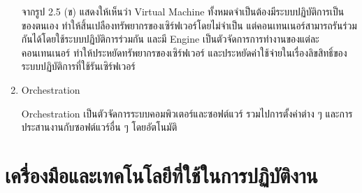 \begin{enumerate}
	จากรูป 2.5 (ข) แสดงให้เห็นว่า Virtual Machine ทั้งหมดจำเป็นต้องมีระบบปฏิบัติการเป็นของตนเอง ทำให้สิ้นเปลืองทรัพยากรของเซิร์ฟเวอร์โดยไม่จำเป็น แต่คอนเทนเนอร์สามารถรันร่วมกันได้โดยใช้ระบบปฏิบัติการร่วมกัน และมี Engine เป็นตัวจัดการการทำงานของแต่ละคอนเทนเนอร์ ทำให้ประหยัดทรัพยากรของเซิร์ฟเวอร์ และประหยัดค่าใช้จ่ายในเรื่องลิขสิทธิ์ของระบบปฏิบัติการที่ใช้รันเซิร์ฟเวอร์ ~\cite{docker}
	
	\item Orchestration
	
	Orchestration เป็นตัวจัดการระบบคอมพิวเตอร์และซอฟต์แวร์ รวมไปการตั้งค่าต่าง ๆ และการประสานงานกับซอฟต์แวร์อื่น ๆ โดยอัตโนมัติ ~\cite{orchestration}
	
\end{enumerate}

\section{เครื่องมือและเทคโนโลยีที่ใช้ในการปฏิบัติงาน}
